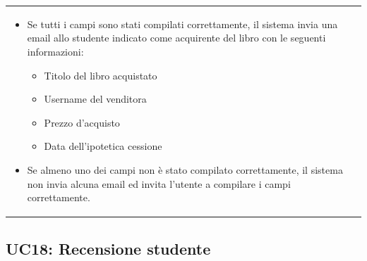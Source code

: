 \documentclass[10pt,a4paper]{report}
\begin{document}
\begin{tabular}{lp{}}
\begin{enumerate}
			\begin{itemize}
				\item Se tutti i campi sono stati compilati correttamente, il sistema invia una email allo studente indicato come acquirente del libro con le seguenti informazioni:
				\begin{itemize}
					\item Titolo del libro acquistato
					\item Username del venditora
					\item Prezzo d'acquisto
					\item Data dell'ipotetica cessione
				\end{itemize}
				\item Se almeno uno dei campi non è stato compilato correttamente, il sistema non invia alcuna email ed invita l'utente a compilare i campi correttamente.
			\end{itemize}
		\end{enumerate}
	\end{tabular}

	\subsection{UC18: Recensione studente}
\end{document}
